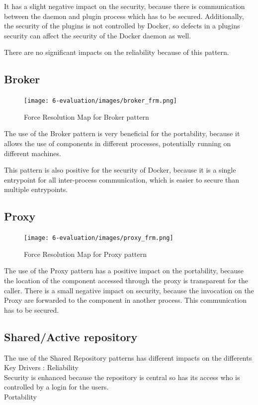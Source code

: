 It has a slight negative impact on the security, because there is communication between the daemon and plugin process which has to be secured. Additionally, the security of the plugins is not controlled by Docker, so defects in a plugins security can affect the security of the Docker daemon as well. 

There are no significant impacts on the reliability because of this pattern.

\subsection{Broker}
\begin{figure}[H]
\centering
\texttt{[image: 6-evaluation/images/broker\_frm.png]}
\caption{Force Resolution Map for Broker pattern}
\label{fig:broker-frm}
\end{figure}
The use of the Broker pattern is very beneficial for the portability, because it allows the use of components in different processes, potentially running on different machines.

This pattern is also positive for the security of Docker, because it is a single entrypoint for all inter-process communication, which is easier to secure than multiple entrypoints.


\subsection{Proxy}
\begin{figure}[H]
\centering
\texttt{[image: 6-evaluation/images/proxy\_frm.png]}
\caption{Force Resolution Map for Proxy pattern}
\label{fig:proxy-frm}
\end{figure}
The use of the Proxy pattern has a positive impact on the portability, because the location of the component accessed through the proxy is transparent for the caller.
There is a small negative impact on security, because the invocation on the Proxy are forwarded to the component in another process. This communication has to be secured.


\subsection{Shared/Active repository} 
The use of the Shared Repository patterns has different impacts on the differents Key Drivers : 
Reliability \\
Security is enhanced because the repository is central so has its access who is controlled by a login for the users. \\
Portability \\

